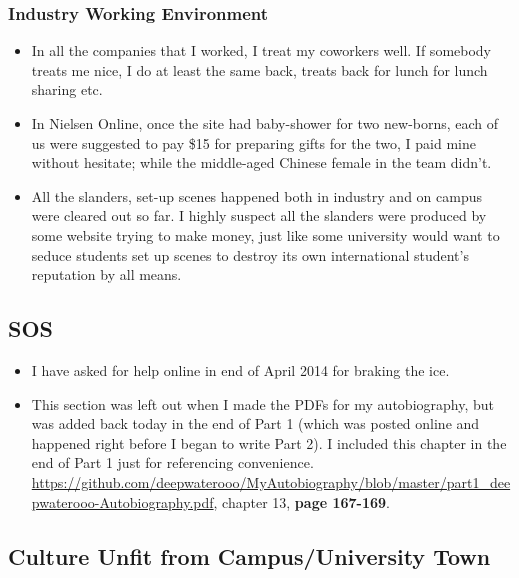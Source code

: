 \documentclass[9pt,b5paper]{article}
\begin{document}
\subsubsection{Industry Working Environment}
\label{sec-12-1-3}
\begin{itemize}
\item In all the companies that I worked, I treat my coworkers well. If somebody treats me nice, I do at least the same back, treats back for lunch for lunch sharing etc.
\item In Nielsen Online, once the site had baby-shower for two new-borns, each of us were suggested to pay \$15 for preparing gifts for the two, I paid mine without hesitate; while the middle-aged Chinese female in the team didn't.
\item All the slanders, set-up scenes happened both in industry and on campus were cleared out so far. I highly suspect all the slanders were produced by some website trying to make money, just like some university would want to seduce students set up scenes to destroy its own international student's reputation by all means.
\end{itemize}
\subsection{SOS}
\label{sec-12-2}
\begin{itemize}
\item I have asked for help online in end of April 2014 for braking the ice.
\item This section was left out when I made the PDFs for my autobiography, but was added back today in the end of Part 1 (which was posted online and happened right before I began to write Part 2). I included this chapter in the end of Part 1 just for referencing convenience. \url{https://github.com/deepwaterooo/MyAutobiography/blob/master/part1_deepwaterooo-Autobiography.pdf}, chapter 13, \textbf{page 167-169}.
\end{itemize}

\subsection{Culture Unfit from Campus/University Town}
\label{sec-12-3}
\end{document}
